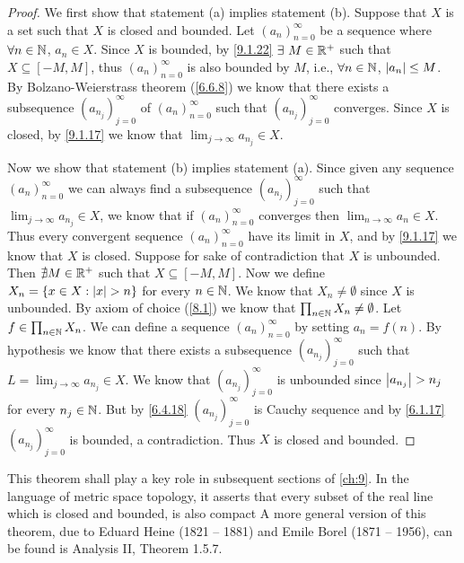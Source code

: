 \begin{proof}
  We first show that statement (a) implies statement (b).
  Suppose that \(X\) is a set such that \(X\) is closed and bounded.
  Let \((a_n)_{n = 0}^\infty\) be a sequence where \(\forall n \in \mathbb{N}\), \(a_n \in X\).
  Since \(X\) is bounded, by \cref{9.1.22} \(\exists\ M \in \R^+\) such that \(X \subseteq [-M, M]\), thus \((a_n)_{n = 0}^\infty\) is also bounded by \(M\), i.e., \(\forall n \in \mathbb{N}\), \(\left\lvert a_n\right\rvert \leq M\).
  By Bolzano-Weierstrass theorem (\cref{6.6.8}) we know that there exists a subsequence \((a_{n_j})_{j = 0}^\infty\) of \((a_n)_{n = 0}^\infty\) such that \((a_{n_j})_{j = 0}^\infty\) converges.
  Since \(X\) is closed, by \cref{9.1.17} we know that \(\lim_{j \to \infty} a_{n_j} \in X\).

  Now we show that statement (b) implies statement (a).
  Since given any sequence \((a_n)_{n = 0}^\infty\) we can always find a subsequence \((a_{n_j})_{j = 0}^\infty\) such that \(\lim_{j \to \infty} a_{n_j} \in X\), we know that if \((a_n)_{n = 0}^\infty\) converges then \(\lim_{n \to \infty} a_n \in X\).
  Thus every convergent sequence \((a_n)_{n = 0}^\infty\) have its limit in \(X\), and by \cref{9.1.17} we know that \(X\) is closed.
  Suppose for sake of contradiction that \(X\) is unbounded.
  Then \(\nexists M \in \mathbb{R}^+\) such that \(X \subseteq [-M, M]\).
  Now we define \(X_n = \{x \in X : \left\lvert x\right\rvert > n\}\) for every \(n \in \mathbb{N}\).
  We know that \(X_n \neq \emptyset\) since \(X\) is unbounded.
  By axiom of choice (\cref{8.1}) we know that \(\prod_{n \in \mathbb{N}} X_n \neq \emptyset\).
  Let \(f \in \prod_{n \in \mathbb{N}} X_n\).
  We can define a sequence \((a_n)_{n = 0}^\infty\) by setting \(a_n = f(n)\).
  By hypothesis we know that there exists a subsequence \((a_{n_j})_{j = 0}^\infty\) such that \(L = \lim_{j \to \infty} a_{n_j} \in X\).
  We know that \((a_{n_j})_{j = 0}^\infty\) is unbounded since \(\left\lvert a_{n_j}\right\rvert > n_j\) for every \(n_j \in \mathbb{N}\).
  But by \cref{6.4.18} \((a_{n_j})_{j = 0}^\infty\) is Cauchy sequence and by \cref{6.1.17} \((a_{n_j})_{j = 0}^\infty\) is bounded, a contradiction.
  Thus \(X\) is closed and bounded.
\end{proof}

\begin{rmk}\label{9.1.25}
  This theorem shall play a key role in subsequent sections of \cref{ch:9}.
  In the language of metric space topology, it asserts that every subset of the real line which is closed and bounded, is also compact
  A more general version of this theorem, due to Eduard Heine (1821 -- 1881) and Emile Borel (1871 -- 1956), can be found is Analysis II, Theorem 1.5.7.
\end{rmk}

